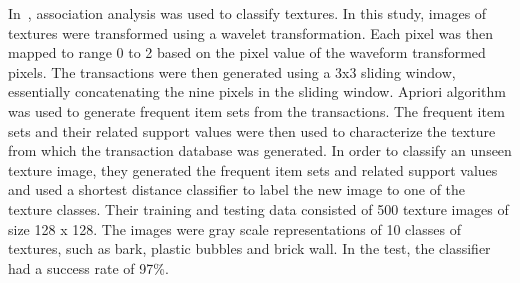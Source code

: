 In~\cite{KARABATAK201132}, association analysis was used to classify textures. In this study, images of textures were transformed using a wavelet transformation. Each pixel was then mapped to range 0 to 2 based on the pixel value of the waveform transformed pixels. The transactions were then generated using a 3x3 sliding window, essentially concatenating the nine pixels in the sliding window. Apriori algorithm was used to generate frequent item sets from the transactions. The frequent item sets and their related support values were then used to characterize the texture from which the transaction database was generated. In order to classify an unseen texture image, they generated the frequent item sets and related support values and used a shortest distance classifier to label the new image to one of the texture classes. Their training and testing data consisted of 500 texture images of size 128 x 128. The images were gray scale representations of 10 classes of textures, such as bark, plastic bubbles and brick wall. In the test, the classifier had a success rate of 97\%. 